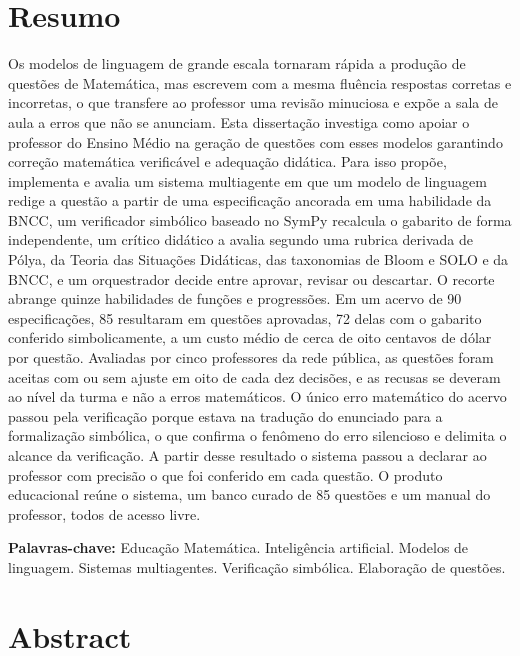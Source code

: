 
\chapter*{Resumo}

Os modelos de linguagem de grande escala tornaram rápida a produção de questões de Matemática,
mas escrevem com a mesma fluência respostas corretas e incorretas, o que transfere ao professor uma
revisão minuciosa e expõe a sala de aula a erros que não se anunciam. Esta dissertação investiga como
apoiar o professor do Ensino Médio na geração de questões com esses modelos garantindo correção
matemática verificável e adequação didática. Para isso propõe, implementa e avalia um sistema
multiagente em que um modelo de linguagem redige a questão a partir de uma especificação ancorada em
uma habilidade da BNCC, um verificador simbólico baseado no SymPy recalcula o gabarito de forma
independente, um crítico didático a avalia segundo uma rubrica derivada de Pólya, da Teoria das
Situações Didáticas, das taxonomias de Bloom e SOLO e da BNCC, e um orquestrador decide entre
aprovar, revisar ou descartar. O recorte abrange quinze habilidades de funções e progressões. Em um
acervo de 90 especificações, 85 resultaram em questões aprovadas, 72 delas com o gabarito conferido
simbolicamente, a um custo médio de cerca de oito centavos de dólar por questão. Avaliadas por cinco
professores da rede pública, as questões foram aceitas com ou sem ajuste em oito de cada dez
decisões, e as recusas se deveram ao nível da turma e não a erros matemáticos. O único erro
matemático do acervo passou pela verificação porque estava na tradução do enunciado para a
formalização simbólica, o que confirma o fenômeno do erro silencioso e delimita o alcance da
verificação. A partir desse resultado o sistema passou a declarar ao professor com precisão o que foi
conferido em cada questão. O produto educacional reúne o sistema, um banco curado de 85 questões e um
manual do professor, todos de acesso livre.

\medskip
\noindent\textbf{Palavras-chave:} Educação Matemática. Inteligência artificial. Modelos de linguagem.
Sistemas multiagentes. Verificação simbólica. Elaboração de questões.

\chapter*{Abstract}

